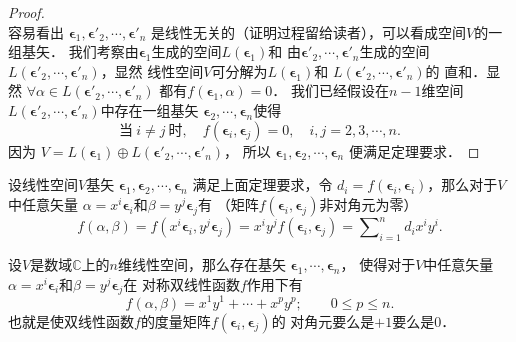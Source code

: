 \begin{proof}
\begin{equation*}
    \end{equation*}
    容易看出
    $\boldsymbol{\epsilon}_1,\boldsymbol{\epsilon}'_2,\cdots,\boldsymbol{\epsilon}'_n$
    是线性无关的（证明过程留给读者），可以看成空间$V$的一组基矢．
    我们考察由$\boldsymbol{\epsilon}_1$生成的空间$L(\boldsymbol{\epsilon}_1)$和
    由$\boldsymbol{\epsilon}'_2,\cdots,\boldsymbol{\epsilon}'_n$生成的空间
    $L(\boldsymbol{\epsilon}'_2,\cdots,\boldsymbol{\epsilon}'_n)$，显然
    线性空间$V$可分解为$L(\boldsymbol{\epsilon}_1)$和
    $L(\boldsymbol{\epsilon}'_2,\cdots,\boldsymbol{\epsilon}'_n)$的
    {\kaishu 直和}．显然
    $\forall \alpha \in L(\boldsymbol{\epsilon}'_2,\cdots,\boldsymbol{\epsilon}'_n)$
    都有$f(\boldsymbol{\epsilon}_1,\alpha)=0$．
    我们已经假设在$n-1$维空间
    $L(\boldsymbol{\epsilon}'_2,\cdots,\boldsymbol{\epsilon}'_n)$中存在一组基矢
    $\boldsymbol{\epsilon}_2,\cdots,\boldsymbol{\epsilon}_n$使得
    \begin{equation*}
        \text{当} \ i \neq j \ \text{时}, \quad
        f(\boldsymbol{\epsilon}_i,\boldsymbol{\epsilon}_j) = 0,
        \quad i,j=2,3,\cdots, n.
    \end{equation*}
    因为
    $V=L(\boldsymbol{\epsilon}_1) \oplus
    L(\boldsymbol{\epsilon}'_2,\cdots,\boldsymbol{\epsilon}'_n)$，
    所以
    $\boldsymbol{\epsilon}_1,\boldsymbol{\epsilon}_2,\cdots,\boldsymbol{\epsilon}_n$
    便满足定理要求．
\end{proof}


设线性空间$V$基矢
$\boldsymbol{\epsilon}_1,\boldsymbol{\epsilon}_2,\cdots,\boldsymbol{\epsilon}_n$
满足上面定理要求，令
$d_i = f(\boldsymbol{\epsilon}_i,\boldsymbol{\epsilon}_i)$，那么对于$V$中任意矢量
$\alpha = x^i \boldsymbol{\epsilon}_i$和$\beta = y^j \boldsymbol{\epsilon}_j$有
（矩阵$f(\boldsymbol{\epsilon}_i,\boldsymbol{\epsilon}_j)$非对角元为零）
\begin{equation}\label{chmla:eqn_tmp10}
    f(\alpha,\beta)=f(x^i \boldsymbol{\epsilon}_i,y^j \boldsymbol{\epsilon}_j)
    =x^i y^j f( \boldsymbol{\epsilon}_i, \boldsymbol{\epsilon}_j)
    =\sum\nolimits_{i=1}^{n} d_i x^i y^i .
\end{equation}

\begin{corollary}\label{chmla:thm_pm1num-comp}
    设$V$是数域$\mathbb{C}$上的$n$维线性空间，那么存在基矢
    $\boldsymbol{\epsilon}_1,\cdots,\boldsymbol{\epsilon}_n$，
    使得对于$V$中任意矢量
    $\alpha = x^i \boldsymbol{\epsilon}_i$和$\beta = y^j \boldsymbol{\epsilon}_j$在
    对称双线性函数$f$作用下有
    \begin{equation}\label{chmla:eqn_gmetric-comp}
        f(\alpha,\beta)= x^1 y^1 + \cdots + x^p y^p;\qquad
        0 \leqslant p \leqslant n.
    \end{equation}
    也就是使双线性函数$f$的度量矩阵$f(\boldsymbol{\epsilon}_i,\boldsymbol{\epsilon}_j)$的
    对角元要么是$+1$要么是$0$．
\end{corollary}


